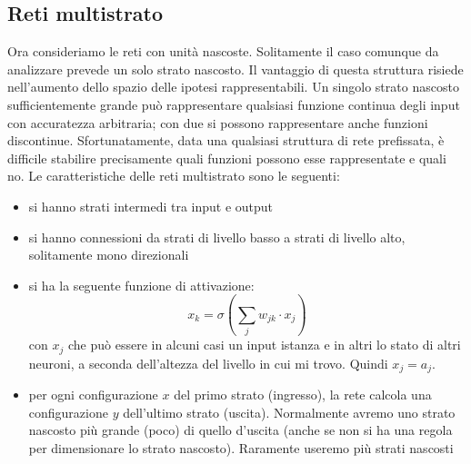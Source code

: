 					\subsection{Reti multistrato}
					Ora consideriamo le reti con unità nascoste. Solitamente il caso comunque da analizzare prevede un solo strato nascosto. Il vantaggio di questa struttura risiede nell'aumento dello spazio delle ipotesi rappresentabili. Un singolo strato nascosto sufficientemente grande può rappresentare qualsiasi funzione continua degli input con accuratezza arbitraria; con due si possono rappresentare anche funzioni discontinue. Sfortunatamente, data una qualsiasi struttura di rete prefissata, è difficile stabilire precisamente quali funzioni possono esse rappresentate e quali no. Le caratteristiche delle reti multistrato sono le seguenti:
						\begin{itemize}
							\item si hanno strati intermedi tra input e output
							\item si hanno connessioni da strati di livello basso a strati di livello
							      alto, solitamente mono direzionali
							\item si ha la seguente funzione di attivazione:
							      \[x_k=\sigma\left(\sum_{j}w_{jk}\cdot x_j\right)\]
							      con $x_j$ che può essere in alcuni
							      casi un input istanza e in altri lo stato di altri neuroni, a seconda
							      dell'altezza del livello in cui mi trovo. Quindi $x_j = a_j$. 
							\item per ogni configurazione $x$ del primo strato (ingresso), la rete calcola
							      una configurazione $y$ dell'ultimo strato (uscita). Normalmente avremo uno
							      strato nascosto più grande (poco) di quello d'uscita (anche se non si ha una
							      regola per dimensionare lo strato nascosto). Raramente useremo più strati
							      nascosti
						\end{itemize}
